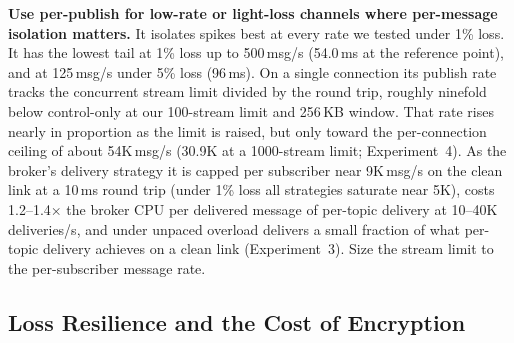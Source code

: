 \documentclass[a4paper,fleqn]{cas-dc}
\begin{document}
\textbf{Use per-publish for low-rate or light-loss channels where per-message isolation matters.} It isolates spikes best at every rate we tested under 1\% loss. It has the lowest tail at 1\% loss up to 500\,msg/s (54.0\,ms at the reference point), and at 125\,msg/s under 5\% loss (96\,ms). On a single connection its publish rate tracks the concurrent stream limit divided by the round trip, roughly ninefold below control-only at our 100-stream limit and 256\,KB window. That rate rises nearly in proportion as the limit is raised, but only toward the per-connection ceiling of about 54K\,msg/s (30.9K at a 1000-stream limit; Experiment~4). As the broker's delivery strategy it is capped per subscriber near 9K\,msg/s on the clean link at a 10\,ms round trip (under 1\% loss all strategies saturate near 5K), costs 1.2--1.4$\times$ the broker CPU per delivered message of per-topic delivery at 10--40K deliveries/s, and under unpaced overload delivers a small fraction of what per-topic delivery achieves on a clean link (Experiment~3). Size the stream limit to the per-subscriber message rate.

\subsection{Loss Resilience and the Cost of Encryption}
\end{document}
